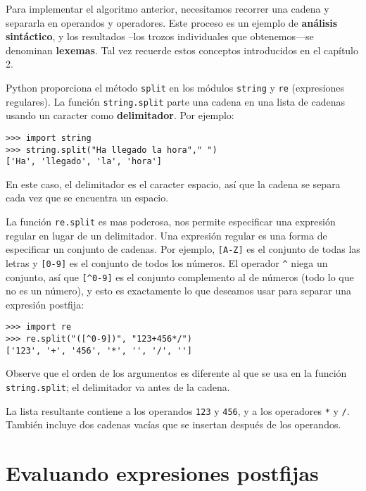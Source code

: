   

Para implementar el algoritmo anterior, necesitamos recorrer una cadena
y separarla en operandos y operadores. Este proceso es un ejemplo
de \textbf{análisis sintáctico}, y los resultados –los trozos individuales
que obtenemos—se denominan \textbf{lexemas}. Tal vez recuerde estos
conceptos introducidos en el capítulo 2.

Python proporciona el método \texttt{split} en los módulos \texttt{string}
y \texttt{re} (expresiones regulares). La función \texttt{string.split}
parte una cadena en una lista de cadenas usando un caracter como \textbf{delimitador}.
Por ejemplo:

\beforeverb 
\begin{verbatim}
>>> import string
>>> string.split("Ha llegado la hora"," ")
['Ha', 'llegado', 'la', 'hora']
\end{verbatim}
\afterverb En este caso, el delimitador es el caracter espacio, así
que la cadena se separa cada vez que se encuentra un espacio.

La función \texttt{re.split} es mas poderosa, nos permite especificar
una expresión regular en lugar de un delimitador. Una expresión regular
es una forma de especificar un conjunto de cadenas. Por ejemplo, \verb+[A-Z]+
es el conjunto de todas las letras y \verb+[0-9]+ es el conjunto
de todos los números. El operador \verb+^+ niega un conjunto, así
que \verb+[^0-9]+ es el conjunto complemento al de números (todo
lo que no es un número), y esto es exactamente lo que deseamos usar
para separar una expresión postfija:

\beforeverb 
\begin{verbatim}
>>> import re
>>> re.split("([^0-9])", "123+456*/")
['123', '+', '456', '*', '', '/', '']
\end{verbatim}
\afterverb Observe que el orden de los argumentos es diferente al
que se usa en la función \texttt{string.split}; el delimitador va
antes de la cadena.

La lista resultante contiene a los operandos \texttt{123} y \texttt{456},
y a los operadores \texttt{{*}} y \texttt{/}. También incluye dos
cadenas vacías que se insertan después de los operandos.

\section{Evaluando expresiones postfijas}

